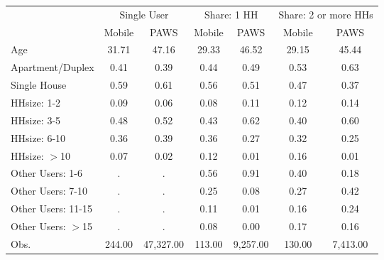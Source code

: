 \begin{tabular}{lcccccc}
&\multicolumn{2}{c}{Single User} & \multicolumn{2}{c}{Share: 1 HH} & \multicolumn{2}{c}{Share: 2 or more HHs} \\
                    &      Mobile&        PAWS&      Mobile&        PAWS&      Mobile&        PAWS\\
\hline
Age                 &       31.71&       47.16&       29.33&       46.52&       29.15&       45.44\\
Apartment/Duplex    &        0.41&        0.39&        0.44&        0.49&        0.53&        0.63\\
Single House        &        0.59&        0.61&        0.56&        0.51&        0.47&        0.37\\
HHsize: 1-2         &        0.09&        0.06&        0.08&        0.11&        0.12&        0.14\\
HHsize: 3-5         &        0.48&        0.52&        0.43&        0.62&        0.40&        0.60\\
HHsize: 6-10        &        0.36&        0.39&        0.36&        0.27&        0.32&        0.25\\
HHsize: $>$10       &        0.07&        0.02&        0.12&        0.01&        0.16&        0.01\\
Other Users: 1-6    &           .&           .&        0.56&        0.91&        0.40&        0.18\\
Other Users: 7-10   &           .&           .&        0.25&        0.08&        0.27&        0.42\\
Other Users: 11-15  &           .&           .&        0.11&        0.01&        0.16&        0.24\\
Other Users: $>$15  &           .&           .&        0.08&        0.00&        0.17&        0.16\\
Obs.                &      244.00&   47,327.00&      113.00&    9,257.00&      130.00&    7,413.00\\
\hline
\end{tabular}
